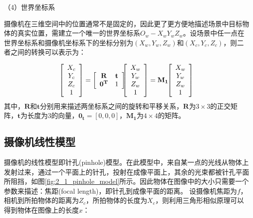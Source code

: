 （4）世界坐标系

摄像机在三维空间中的位置通常不是固定的，因此更了更方便地描述场景中目标物体的真实位置，需建立一个唯一的世界坐标系$O_w-X_wY_wZ_w$。设场景中任一点在世界坐标系和摄像机坐标系下的坐标分别为$(X_w, Y_w, Z_w)$和$(X_c, Y_c, Z_c)$，则二者之间的转换可以表示为：

\begin{eqnarray}\label{eq:2_1_world_camera_coord_transform}
\left[\begin{array}{c} X_c \\ Y_c \\ Z_c \\ 1 \end{array} \right]
=
\left[\begin{array}{cc}
\mathbf{R} & \mathbf{t}  \\
\mathbf{0^T} & 1
\end{array}
\right]
\hspace{-6pt} %
\left[\begin{array}{c} X_w \\ Y_w \\ Z_w \\ 1 \end{array}\right]
=\mathbf{M_1}
\hspace{-3pt} 
\left[\begin{array}{c} X_w \\ Y_w \\ Z_w \\ 1 \end{array}\right]
\end{eqnarray}
其中，$\mathbf{R}$和$\mathbf{t}$分别用来描述两坐标系之间的旋转和平移关系，$\mathbf{R}$为$3\times 3$的正交矩阵，$\mathbf{t}$为长度为3的向量，$\mathbf{0_t}=[0, 0, 0]$，$\mathbf{M_1}$为$4\times4$的矩阵。


\subsection{摄像机线性模型}
摄像机的线性模型即针孔(pinhole)模型\cite{zhang1999flexible, zhang2000flexible}。在此模型中，来自某一点的光线从物体上发射过来，通过一个平面上的针孔，投射在成像平面上，其余的光束都被针孔平面所阻挡，如图\ref{fig:2_1_pinhole_model}所示。因此物体在图像中的大小只需要一个参数来描述：焦距(focal length)，即针孔到成像平面的距离。 设摄像机焦距为$f$，相机到所拍物体的距离为$Z_c$，所拍物体的长度为$X_c$，则利用三角形相似原理可以得到物体在图像上的长度$x$：

